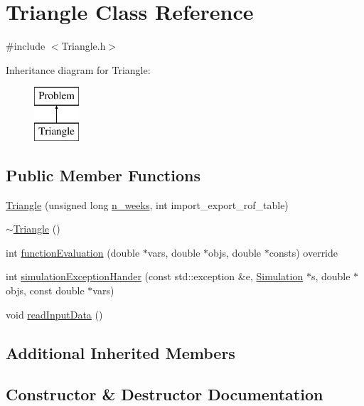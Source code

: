 \hypertarget{classTriangle}{}\section{Triangle Class Reference}
\label{classTriangle}


{\ttfamily \#include $<$Triangle.\+h$>$}

Inheritance diagram for Triangle\+:\begin{figure}[H]
\begin{center}
\leavevmode
\includegraphics[height=2.000000cm]{classTriangle}
\end{center}
\end{figure}
\subsection*{Public Member Functions}
\begin{DoxyCompactItemize}
\item 
\mbox{\hyperlink{classTriangle_a24833bad242ddc3f671b36678dff5738}{Triangle}} (unsigned long \mbox{\hyperlink{classProblem_ac7513bb0ecdfa4bbb7d2ada3595d71ec}{n\+\_\+weeks}}, int import\+\_\+export\+\_\+rof\+\_\+table)
\item 
\mbox{\hyperlink{classTriangle_a5199760a17454f4dc94c855a57e3a152}{$\sim$\+Triangle}} ()
\item 
int \mbox{\hyperlink{classTriangle_a9e95039d098fd61cce1a830b85ed7004}{function\+Evaluation}} (double $\ast$vars, double $\ast$objs, double $\ast$consts) override
\item 
int \mbox{\hyperlink{classTriangle_a816ff476231f6bd575c82978706f4b9a}{simulation\+Exception\+Hander}} (const std\+::exception \&e, \mbox{\hyperlink{classSimulation}{Simulation}} $\ast$s, double $\ast$objs, const double $\ast$vars)
\item 
void \mbox{\hyperlink{classTriangle_a045e3263a62a8a628fe5645f0323b7e4}{read\+Input\+Data}} ()
\end{DoxyCompactItemize}
\subsection*{Additional Inherited Members}


\subsection{Constructor \& Destructor Documentation}
\mbox{\label{classTriangle_a24833bad242ddc3f671b36678dff5738}} 

